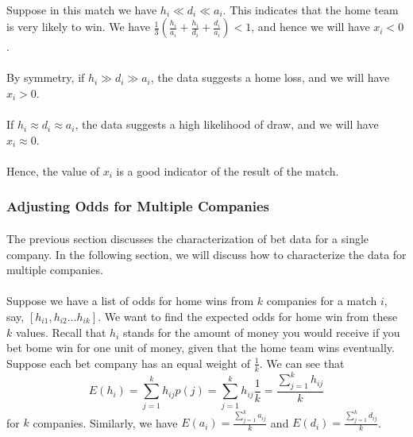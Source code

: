 \documentclass[12pt]{article}
\begin{document}
\paragraph{}
Suppose in this match we have $h_i \ll d_i \ll a_i$. This indicates that the home team is very likely to win. We have $\frac{1}{3}(\frac{h_i}{a_i} + \frac{h_i}{d_i} + \frac{d_i}{a_i}) < 1$, and hence we will have $x_i < 0$. 
\paragraph{}
By symmetry, if $h_i \gg d_i \gg a_i$, the data suggests a home loss, and we will have $x_i > 0$.
\paragraph{}
If $h_i \approx d_i \approx a_i$, the data suggests a high likelihood of draw, and we will have $x_i \approx 0$.
\paragraph{}
Hence, the value of $x_i$ is a good indicator of the result of the match.
\subsubsection{Adjusting Odds for Multiple Companies}
\paragraph{}
The previous section discusses the characterization of bet data for a single company. In the following section, we will discuss how to characterize the data for multiple companies.
\paragraph{}
Suppose we have a list of odds for home wins from $k$ companies for a match $i$, say, $[h_{i1}, h_{i2} \ldots h_{ik}]$. We want to find the expected odds for home win from these $k$ values. Recall that $h_i$ stands for the amount of money you would receive if you bet bome win for one unit of money, given that the home team wins eventually. Suppose each bet company has an equal weight of $\frac{1}{k}$. We can see that \[
E(h_i) = \sum_{j = 1}^{k}h_{ij}p(j) = \sum_{j = 1}^{k}h_{ij}\frac{1}{k} = \frac{\sum_{j = 1}^{k}h_{ij}}{k}
\]
for $k$ companies. Similarly, we have $
E(a_i) = \frac{\sum_{j = 1}^{k}a_{ij}}{k}$ and $ E(d_i) = \frac{\sum_{j = 1}^{k}d_{ij}}{k}$.
\end{document}
